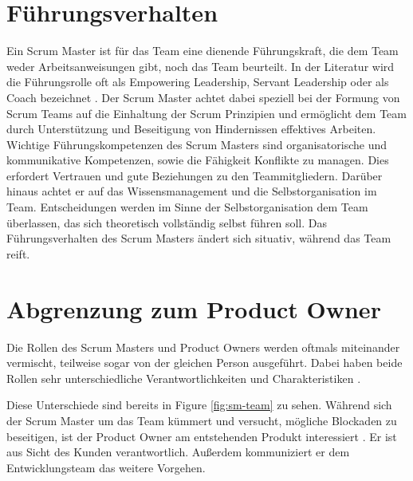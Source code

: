 \documentclass[5pt, final]{beamer}
\begin{document}
\begin{frame}[t]
\begin{multicols}{3}
			\section {Führungsverhalten}
            
            Ein Scrum Master ist für das Team eine dienende Führungskraft, die dem Team weder Arbeitsanweisungen gibt, noch das Team beurteilt. In der Literatur wird die Führungsrolle oft als Empowering Leadership, Servant Leadership oder als Coach bezeichnet \cite{Spiegler21}\cite{Frye24}. Der Scrum Master achtet dabei speziell bei der Formung von Scrum Teams auf die Einhaltung der Scrum Prinzipien und ermöglicht dem Team durch Unterstützung und Beseitigung von Hindernissen effektives Arbeiten. 
            Wichtige Führungskompetenzen des Scrum Masters sind organisatorische und kommunikative Kompetenzen, sowie die Fähigkeit Konflikte zu managen. Dies erfordert Vertrauen und gute Beziehungen zu den Teammitgliedern. Darüber hinaus achtet er auf das Wissensmanagement und die Selbstorganisation im Team.\cite{Frye24} 
            Entscheidungen werden im Sinne der Selbstorganisation dem Team überlassen, das sich theoretisch vollständig selbst führen soll. Das Führungsverhalten des Scrum Masters ändert sich situativ, während das Team reift. \cite{Spiegler21}
			
			\section{Abgrenzung zum Product Owner}
			
            Die Rollen des Scrum Masters und Product Owners werden oftmals miteinander vermischt, teilweise sogar von der gleichen Person ausgeführt.
            Dabei haben beide Rollen sehr unterschiedliche Verantwortlichkeiten und Charakteristiken \cite{sutherland14}.
            
            Diese Unterschiede sind bereits in Figure \ref{fig:sm-team} zu sehen.
            Während sich der Scrum Master um das Team kümmert und versucht, mögliche Blockaden zu beseitigen, ist der Product Owner am entstehenden Produkt interessiert \cite{Spiegler21}.
            Er ist aus Sicht des Kunden verantwortlich.
            Außerdem kommuniziert er dem Entwicklungsteam das weitere Vorgehen.
            

\end{multicols}
\end{frame}
\end{document}
